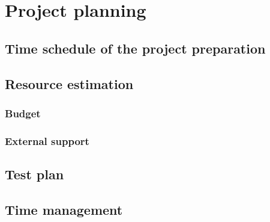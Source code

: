 \documentclass[11pt]{article}
\begin{document}



\section{Project planning}

\subsection{Time schedule of the project preparation}

\subsection{Resource estimation}

\subsubsection{Budget}

\subsubsection{External support}

\subsection{Test plan}

\subsection{Time management}
\end{document}
